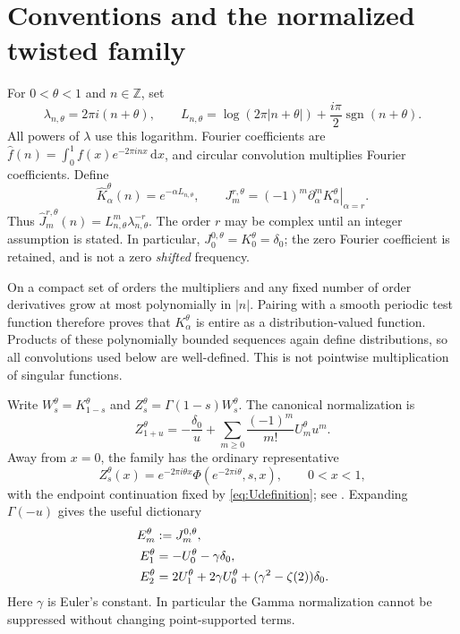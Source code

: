 \documentclass[11pt,a4paper]{article}
\numberwithin{equation}{section}
\theoremstyle{definition}\newtheorem{definition}[theorem]{Definition}
\theoremstyle{remark}\newtheorem{remark}[theorem]{Remark}
\DeclareMathOperator{\sgn}{sgn}
\newcommand{\dd}{\,\mathrm d}
\newcommand{\Z}{\mathbb Z}\newcommand{\N}{\mathbb N}\newcommand{\C}{\mathbb C}
\newcommand{\wt}[1]{\widehat{#1}}
\begin{document}
\section{Conventions and the normalized twisted family}
\label{sec:conventions}
For $0<\theta<1$ and $n\in\Z$, set
\begin{equation}
 \lambda_{n,\theta}=2\pi i(n+\theta),\qquad
 L_{n,\theta}=\log(2\pi|n+\theta|)
       +\frac{i\pi}{2}\sgn(n+\theta).
 \label{eq:lambda}
\end{equation}
All powers of $\lambda$ use this logarithm. Fourier coefficients are
$\wt f(n)=\int_0^1f(x)e^{-2\pi i n x}\dd x$, and circular convolution
multiplies Fourier coefficients. Define
\begin{equation}
 \wt K_\alpha^\theta(n)=e^{-\alpha L_{n,\theta}},\qquad
 J_m^{r,\theta}=(-1)^m
      \left.\partial_\alpha^mK_\alpha^\theta\right|_{\alpha=r}.
 \label{eq:KJ}
\end{equation}
Thus $\wt J_m^{r,\theta}(n)=L_{n,\theta}^m\lambda_{n,\theta}^{-r}$.
The order $r$ may be complex until an integer assumption is stated.
In particular, $J_0^{0,\theta}=K_0^\theta=\delta_0$; the zero Fourier
coefficient is retained, and is not a zero \emph{shifted} frequency.

On a compact set of orders the multipliers and any fixed number of
order derivatives grow at most polynomially in $|n|$. Pairing with a
smooth periodic test function therefore proves that $K_\alpha^\theta$
is entire as a distribution-valued function. Products of these polynomially
bounded sequences again define distributions, so all convolutions used
below are well-defined. This is not pointwise multiplication of singular
functions.

Write $W_s^\theta=K_{1-s}^\theta$ and
$Z_s^\theta=\Gamma(1-s)W_s^\theta$. The canonical normalization is
\begin{equation}
 Z_{1+u}^\theta=-\frac{\delta_0}{u}
       +\sum_{m\ge0}\frac{(-1)^m}{m!}U_m^\theta u^m.
 \label{eq:Udefinition}
\end{equation}
Away from $x=0$, the family has the ordinary representative
\begin{equation}
 Z_s^\theta(x)=e^{-2\pi i\theta x}
     \Phi(e^{-2\pi i\theta},s,x),\qquad 0<x<1,
 \label{eq:Zrep}
\end{equation}
with the endpoint continuation fixed by \eqref{eq:Udefinition}; see
\cite{repo-twisted}. Expanding $\Gamma(-u)$ gives the useful dictionary
\begin{align}
 E_m^\theta&:=J_m^{0,\theta},\notag\\
 E_1^\theta&=-U_0^\theta-\gamma\delta_0,\label{eq:Edict1}\\
 E_2^\theta&=2U_1^\theta+2\gamma U_0^\theta
                +(\gamma^2-\zeta(2))\delta_0.\label{eq:Edict2}
\end{align}
Here $\gamma$ is Euler's constant. In particular the Gamma normalization
cannot be suppressed without changing point-supported terms.
\end{document}

